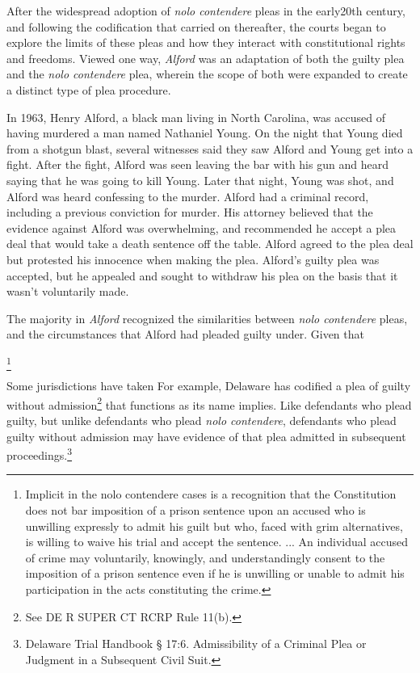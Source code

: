 After the widespread adoption of \textit{nolo contendere} pleas in the early20th century, and following the codification that carried on thereafter, the courts began to explore the limits of these pleas and how they interact with constitutional rights and freedoms. Viewed one way, \textit{Alford} was an adaptation of both the guilty plea and the \textit{nolo contendere} plea, wherein the scope of both were expanded to create a distinct type of plea procedure.

In 1963, Henry Alford, a black man living in North Carolina, was accused of having murdered a man named Nathaniel Young. On the night that Young died from a shotgun blast, several witnesses said they saw Alford and Young get into a fight. After the fight, Alford was seen leaving the bar with his gun and heard saying that he was going to kill Young. Later that night, Young was shot, and Alford was heard confessing to the murder. Alford had a criminal record, including a previous conviction for murder. His attorney believed that the evidence against Alford was overwhelming, and recommended he accept a plea deal that would take a death sentence off the table. Alford agreed to the plea deal but protested his innocence when making the plea. Alford’s guilty plea was accepted, but he appealed and sought to withdraw his plea on the basis that it wasn’t voluntarily made.

The majority in \textit{Alford} recognized the similarities between \textit{nolo contendere} pleas, and the circumstances that Alford had pleaded guilty under. Given that 

\footnote{Implicit in the nolo contendere cases is a recognition that the Constitution does not bar imposition of a prison sentence upon an accused who is unwilling expressly to admit his guilt but who, faced with grim alternatives, is willing to waive his trial and accept the sentence. ... An individual accused of crime may voluntarily, knowingly, and understandingly consent to the imposition of a prison sentence even if he is unwilling or unable to admit his participation in the acts constituting the crime.} 


Some jurisdictions have taken For example, Delaware has codified a plea of guilty without admission\footnote{See DE R SUPER CT RCRP Rule 11(b).} that functions as its name implies. Like defendants who plead guilty, but unlike defendants who plead \textit{nolo contendere}, defendants who plead guilty without admission may have evidence of that plea admitted in subsequent proceedings.\footnote{Delaware Trial Handbook § 17:6. Admissibility of a Criminal Plea or Judgment in a Subsequent Civil Suit.}

